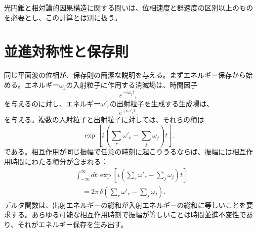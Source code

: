 光円錐と相対論的因果構造に関する問いは、位相速度と群速度の区別以上のものを必要とし、この計算とは別に扱う。

\section{並進対称性と保存則}

同じ平面波の位相が、保存則の簡潔な説明を与える。まずエネルギー保存から始める。エネルギー\(\omega_j\)の入射粒子に作用する消滅場は、時間因子
\begin{equation}
e^{-i\omega_j t},
\end{equation}
を与えるのに対し、エネルギー\(\omega'_r\)の出射粒子を生成する生成場は、
\begin{equation}
e^{+i\omega'_r t}.
\end{equation}
を与える。複数の入射粒子と出射粒子に対しては、それらの積は
\begin{equation}
\exp\!\left[
i\left(\sum_r\omega'_r-\sum_j\omega_j\right)t
\right].
\end{equation}
である。相互作用が同じ振幅で任意の時刻に起こりうるならば、振幅には相互作用時間にわたる積分が含まれる：
\begin{equation}
\begin{aligned}
&\int_{-\infty}^{\infty}dt\,
\exp\!\left[
i\left(\sum_r\omega'_r-\sum_j\omega_j\right)t
\right]
\\
&\quad =2\pi\,
\delta\!\left(\sum_r\omega'_r-\sum_j\omega_j\right).
\end{aligned}
\end{equation}
デルタ関数は、出射エネルギーの総和が入射エネルギーの総和に等しいことを要求する。あらゆる可能な相互作用時刻で振幅が等しいことは時間並進不変性であり、それがエネルギー保存を生み出す。

